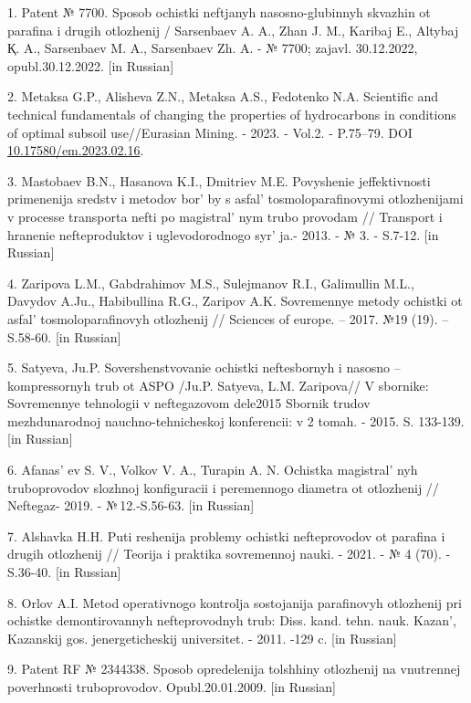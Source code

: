 \begin{refs}
1. Patent № 7700. Sposob ochistki neftjanyh nasosno-glubinnyh skvazhin ot
parafina i drugih otlozhenij / Sarsenbaev A. A., Zhan J. M., Karibaj E.,
Altybaj Қ. A., Sarsenbaev M. A., Sarsenbaev Zh. A. - № 7700; zajavl.
30.12.2022, opubl.30.12.2022. {[}in Russian{]}

2. Metaksa G.P., Alisheva Z.N., Metaksa A.S., Fedotenko N.A. Scientific
and technical fundamentals of changing the properties of hydrocarbons in
conditions of optimal subsoil use//Eurasian Mining. - 2023. - Vol.2. -
P.75--79. DOI
\href{https://doi.org/10.17580/em.2023.02.16}{10.17580/em.2023.02.16}.

3. Mastobaev B.N., Hasanova K.I., Dmitriev M.E. Povyshenie
jeffektivnosti primenenija sredstv i metodov bor' by s
asfal' tosmoloparafinovymi otlozhenijami v processe
transporta nefti po magistral' nym
trubo provodam // Transport i hranenie nefteproduktov i uglevodorodnogo
syr' ja.- 2013. - № 3. - S.7-12. {[}in Russian{]}

4. Zaripova L.M., Gabdrahimov M.S., Sulejmanov R.I., Galimullin M.L.,
Davydov A.Ju., Habibullina R.G., Zaripov A.K. Sovremennye metody
ochistki ot asfal' tosmoloparafinovyh otlozhenij //
Sciences of europe. -- 2017. №19 (19). -- S.58-60. {[}in Russian{]}

5. Satyeva, Ju.P. Sovershenstvovanie ochistki neftesbornyh i nasosno
--kompressornyh trub ot ASPO /Ju.P. Satyeva, L.M. Zaripova// V sbornike:
Sovremennye tehnologii v neftegazovom dele2015 Sbornik trudov
mezhdunarodnoj nauchno-tehnicheskoj konferencii: v 2 tomah. - 2015. S.
133-139. {[}in Russian{]}

6. Afanas' ev S. V., Volkov V. A., Turapin A. N. Ochistka
magistral' nyh truboprovodov slozhnoj konfigu\-racii i
peremennogo diametra ot otlozhenij // Neftegaz- 2019. - №\,12.-S.56-63.
{[}in Russian{]}

7. Alshavka H.H. Puti reshenija problemy ochistki nefteprovodov ot
parafina i drugih otlozhenij // Teorija i praktika sovremennoj nauki. -
2021. - № 4 (70). -S.36-40. {[}in Russian{]}

8. Orlov A.I. Metod operativnogo kontrolja sostojanija parafinovyh
otlozhenij pri ochistke demontirovan\-nyh nefteprovodnyh trub: Diss. kand.
tehn. nauk. Kazan', Kazanskij gos. jenergeticheskij
universitet. - 2011. -129 c. {[}in Russian{]}

9. Patent RF № 2344338. Sposob opredelenija tolshhiny otlozhenij na
vnutrennej poverhnosti trubo\-provodov. Opubl.20.01.2009. {[}in
Russian{]}


\end{refs}
